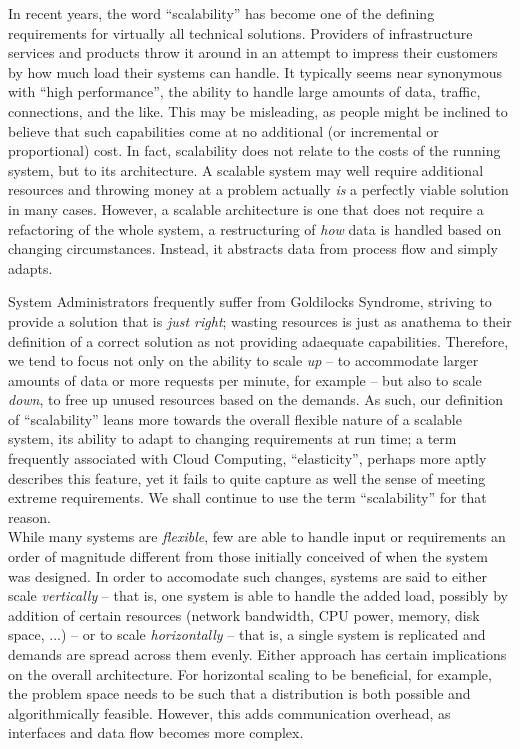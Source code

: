 In recent years, the word ``scalability'' has become
one of the defining requirements for virtually all
technical solutions.  Providers of infrastructure
services and products throw it around in an attempt to
impress their customers by how much load their systems
can handle.  It typically seems near synonymous with
``high performance'', the ability to handle large
amounts of data, traffic, connections, and the like.
This may be misleading, as people might be inclined to
believe that such capabilities come at no additional
(or incremental or proportional) cost.  In fact,
scalability does not relate to the costs of the
running system, but to its architecture.  A scalable
system may well require additional resources and
throwing money at a problem actually {\em is} a
perfectly viable solution in many cases.  However, a
scalable architecture is one that does not require a
refactoring of the whole system, a restructuring of
{\em how} data is handled based on changing
circumstances.  Instead, it abstracts data from
process flow and simply adapts.

System Administrators frequently suffer from
Goldilocks Syndrome, striving to provide a solution
that is {\em just right}; wasting resources is just as
anathema to their definition of a correct solution as
not providing adaequate capabilities.  Therefore, we
tend to focus not only on the ability to scale {\em
up} -- to accommodate larger amounts of data or more
requests per minute, for example -- but also to scale
{\em down}, to free up unused resources based on the
demands.  As such, our definition of ``scalability''
leans more towards the overall flexible nature of a
scalable system, its ability to adapt to changing
requirements at run time; a term frequently associated
with Cloud Computing, ``elasticity'', perhaps more
aptly describes this feature, yet it fails to quite
capture as well the sense of meeting extreme
requirements.  We shall continue to use the term
``scalability'' for that reason.  \\

While many systems are {\em flexible}, few are able to
handle input or requirements an order of magnitude
different from those initially conceived of when the
system was designed.  In order to accomodate such
changes, systems are said to either scale {\em
vertically} -- that is, one system is able to handle
the added load, possibly by addition of certain
resources (network bandwidth, CPU power, memory, disk
space, ...) -- or to scale {\em horizontally} -- that
is, a single system is replicated and demands are
spread across them evenly.  Either approach has
certain implications on the overall architecture.  For
horizontal scaling to be beneficial, for example, the
problem space needs to be such that a distribution is
both possible and algorithmically feasible.  However,
this adds communication overhead, as interfaces and
data flow becomes more complex.

